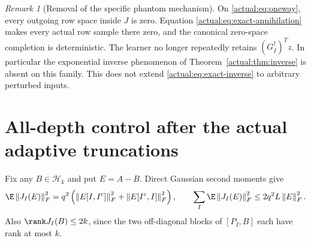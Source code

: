 \documentclass[11pt,oneside,openany,a4paper]{book}
\numberwithin{equation}{chapter}
\theoremstyle{definition}
\theoremstyle{remark}
\newtheorem{remark}[theorem]{Remark}
\newcommand{\F}[1]{\left\lVert#1\right\rVert_F}
\newcommand{\HH}{\mathcal H}\newcommand{\SSS}{\mathcal S}
\begin{document}
\begin{remark}[Removal of the specific phantom mechanism]
On \eqref{actual:eq:oneway}, every outgoing row space inside $J$ is zero. Equation \eqref{actual:eq:exact-annihilation} makes every actual row sample there zero, and the canonical zero-space completion is deterministic. The learner no longer repeatedly retains $(G_I^\dagger)^Tz$. In particular the exponential inverse phenomenon of Theorem~\ref{actual:thm:inverse} is absent on this family. This does not extend \eqref{actual:eq:exact-inverse} to arbitrary perturbed inputs.
\end{remark}

\section{All-depth control after the actual adaptive truncations}
Fix any $B\in\HH_k$ and put $E=A-B$. Direct Gaussian second moments give
\begin{equation}\label{actual:eq:Jbudget}
 \E\F{J_I(E)}^2=q^2\left(\F{E[I,I^c]}^2+\F{E[I^c,I]}^2\right),\qquad
 \sum_I\E\F{J_I(E)}^2\le2q^2 L\F E^2.
\end{equation}
Also $\rank J_I(B)\le2k$, since the two off-diagonal blocks of $[P_I,B]$ each have rank at most $k$.
\end{document}
